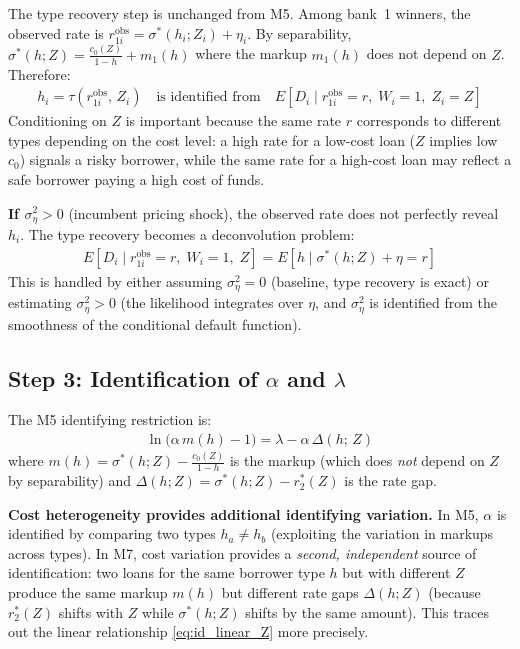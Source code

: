 \documentclass[12pt]{article}
\theoremstyle{plain}
\theoremstyle{plain}
\theoremstyle{definition}  %
\theoremstyle{remark}  %
\begin{document}
The type recovery step is unchanged from M5. Among bank~1 winners, the observed rate is $r_{1i}^{\text{obs}} = \sigma^*(h_i; Z_i) + \eta_i$. By separability, $\sigma^*(h; Z) = \frac{c_0(Z)}{1-h} + m_1(h)$ where the markup $m_1(h)$ does not depend on $Z$. Therefore:
\begin{align}\label{eq:type_recovery}
    h_i = \tau(r_{1i}^{\text{obs}},\, Z_i) \quad\text{is identified from}\quad E[D_i \mid r_{1i}^{\text{obs}} = r,\; W_i = 1,\; Z_i = Z]
\end{align}
Conditioning on $Z$ is important because the same rate $r$ corresponds to different types depending on the cost level: a high rate for a low-cost loan ($Z$ implies low $c_0$) signals a risky borrower, while the same rate for a high-cost loan may reflect a safe borrower paying a high cost of funds.

\medskip\noindent
\textbf{If $\sigma_\eta^2 > 0$} (incumbent pricing shock), the observed rate does not perfectly reveal $h_i$. The type recovery becomes a deconvolution problem:
\begin{align}\label{eq:type_recovery_noisy}
    E[D_i \mid r_{1i}^{\text{obs}} = r,\; W_i = 1,\; Z] = E[h \mid \sigma^*(h; Z) + \eta = r]
\end{align}
This is handled by either assuming $\sigma_\eta^2 = 0$ (baseline, type recovery is exact) or estimating $\sigma_\eta^2 > 0$ (the likelihood integrates over $\eta$, and $\sigma_\eta^2$ is identified from the smoothness of the conditional default function).

\subsection{Step 3: Identification of $\alpha$ and $\lambda$}

The M5 identifying restriction is:
\begin{align}\label{eq:id_linear_Z}
    \ln\!\big(\alpha\, m(h) - 1\big) = \lambda - \alpha\, \Delta(h;\, Z)
\end{align}
where $m(h) = \sigma^*(h; Z) - \frac{c_0(Z)}{1-h}$ is the markup (which does \emph{not} depend on $Z$ by separability) and $\Delta(h; Z) = \sigma^*(h; Z) - r_2^*(Z)$ is the rate gap.

\medskip\noindent
\textbf{Cost heterogeneity provides additional identifying variation.} In M5, $\alpha$ is identified by comparing two types $h_a \neq h_b$ (exploiting the variation in markups across types). In M7, cost variation provides a \emph{second, independent} source of identification: two loans for the same borrower type $h$ but with different $Z$ produce the same markup $m(h)$ but different rate gaps $\Delta(h; Z)$ (because $r_2^*(Z)$ shifts with $Z$ while $\sigma^*(h; Z)$ shifts by the same amount). This traces out the linear relationship \eqref{eq:id_linear_Z} more precisely.
\end{document}
